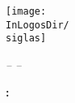 \pagestyle{empty}

\begin{center}
    \vspace{3cm}
    \texttt{[image: \\InLogosDir/\\siglas]}\\
    \begin{huge}
        \underlogotext
    \end{huge}
    \vspace{6cm}

    \begin{huge}
        \doctitle
    \end{huge}
    \vspace{5cm}

    \begin{Large}
        \textit{-- \FinalReport --}
    \end{Large}
    \vspace{5cm}

    \begin{Large}
        \textbf{\LastModification: \fecha}
    \end{Large}
\end{center}